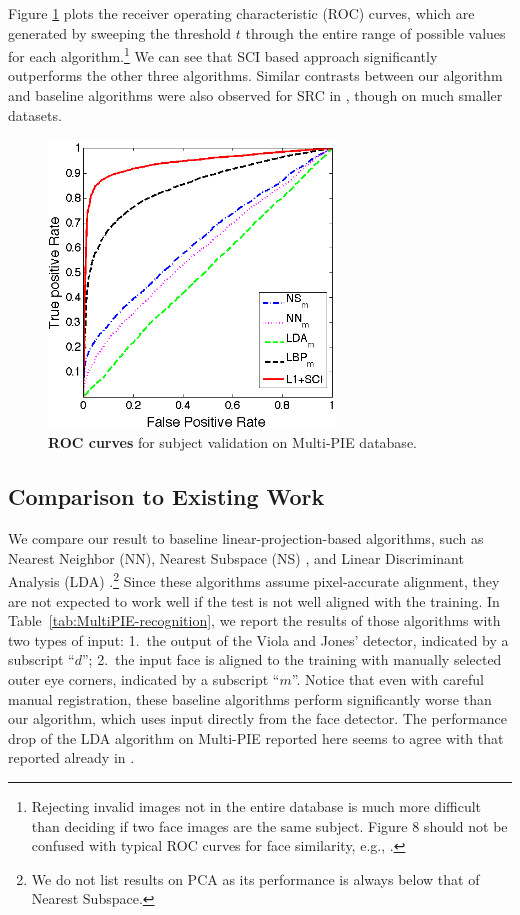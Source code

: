 \documentclass[12pt,journal,draftcls,letterpaper,onecolumn]{IEEEtran}
\providecommand{\DIFaddbeginFL}{} %
\providecommand{\DIFaddendFL}{} %
\begin{document}
Figure \ref{fig:roc-multipie} plots the receiver operating
characteristic (ROC) curves, which are generated by sweeping
the threshold $t$ through the entire range of possible values
for each algorithm.\footnote{Rejecting invalid images not in
the entire database is much more difficult than deciding if two
face images are the same subject. Figure 8 should not be
confused with typical ROC curves for face similarity, e.g.,
\cite{PhillipsP2007}.} We can see that SCI based approach
significantly outperforms the other three algorithms. Similar
contrasts between our algorithm and baseline algorithms were
also observed for SRC in \cite{Wright2009-PAMI}, though on much
smaller datasets.

\begin{figure}
\centerline{
\includegraphics[width=3in]{figures_pami/pami_roc2.png}
}\DIFaddbeginFL \vspace{-.2in}
\DIFaddendFL \caption{{\bf ROC curves} for subject validation on Multi-PIE database.}\label{fig:roc-multipie}
\DIFaddbeginFL \vspace{-.35in}
\DIFaddendFL \end{figure}

\subsection{Comparison to Existing Work}
We compare our result to baseline linear-projection-based
algorithms, such as Nearest Neighbor (NN), Nearest Subspace
(NS) \cite{Lee2005-PAMI}, and Linear Discriminant Analysis
(LDA) \cite{Belhumeur1997-PAMI}.\footnote{We do not list
results on PCA \cite{Turk1991-CVPR} as its performance is
always below that of Nearest Subspace.} Since these algorithms
assume pixel-accurate alignment, they are not expected to work
well if the test is not well aligned with the training. In
Table~\ref{tab:MultiPIE-recognition}, we report the results of
those algorithms with two types of input: 1.\ the output of the
Viola and Jones' detector, indicated by a subscript ``$d$'';
2.\ the input face is aligned to the training with manually
selected outer eye corners, indicated by a subscript ``$m$''.
Notice that even with careful manual registration, these
baseline algorithms perform significantly worse than our
algorithm, which uses input directly from the face detector.
The performance drop of the LDA algorithm on Multi-PIE reported here
seems to agree with that reported already in
\cite{Gross2008-FGR}.
\end{document}
